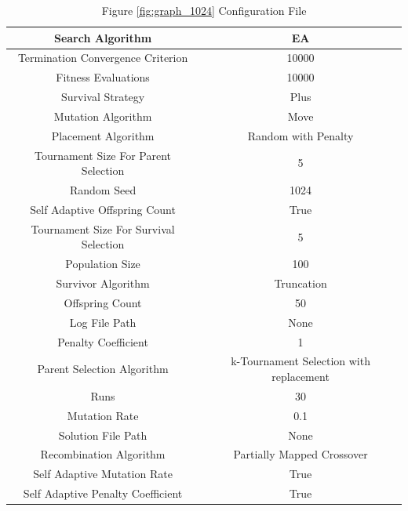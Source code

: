 \documentclass{standalone}
\begin{document}
\begin{table}[!htb]
	\centering
	\caption{Figure \ref{fig:graph_1024} Configuration File}
	\label{tab:graph_1024}
	\begin{tabular}{| c | c |}
		\hline
		Search Algorithm		& EA		 \\
		\hline
		Termination Convergence Criterion		& 10000		 \\
		\hline
		Fitness Evaluations		& 10000		 \\
		\hline
		Survival Strategy		& Plus		 \\
		\hline
		Mutation Algorithm		& Move		 \\
		\hline
		Placement Algorithm		& Random with Penalty		 \\
		\hline
		Tournament Size For Parent Selection		& 5		 \\
		\hline
		Random Seed		& 1024		 \\
		\hline
		Self Adaptive Offspring Count		& True		 \\
		\hline
		Tournament Size For Survival Selection		& 5		 \\
		\hline
		Population Size		& 100		 \\
		\hline
		Survivor Algorithm		& Truncation		 \\
		\hline
		Offspring Count		& 50		 \\
		\hline
		Log File Path		& None		 \\
		\hline
		Penalty Coefficient		& 1		 \\
		\hline
		Parent Selection Algorithm		& k-Tournament Selection with replacement		 \\
		\hline
		Runs		& 30		 \\
		\hline
		Mutation Rate		& 0.1		 \\
		\hline
		Solution File Path		& None		 \\
		\hline
		Recombination Algorithm		& Partially Mapped Crossover		 \\
		\hline
		Self Adaptive Mutation Rate		& True		 \\
		\hline
		Self Adaptive Penalty Coefficient		& True		 \\
		\hline
	\end{tabular}
\end{table}
\end{document}
